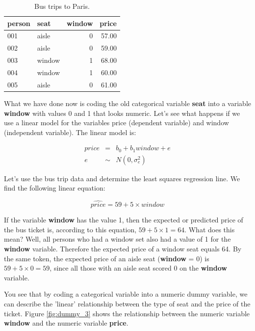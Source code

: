 \documentclass[]{book}\usepackage[]{graphicx}\usepackage[]{color}
\begin{document}
\begin{table}[ht]
\centering
\caption{Bus trips to Paris.} 
\label{tab:dummy_2}
\begin{tabular}{llrr}
  \hline
person & seat & window & price \\ 
  \hline
001 & aisle & 0 & 57.00 \\ 
  002 & aisle & 0 & 59.00 \\ 
  003 & window & 1 & 68.00 \\ 
  004 & window & 1 & 60.00 \\ 
  005 & aisle & 0 & 61.00 \\ 
   \hline
\end{tabular}
\end{table}


What we have done now is coding the old categorical variable \textbf{seat} into a variable \textbf{window} with values 0 and 1 that looks numeric. Let's see what happens if we use a linear model for the variables price (dependent variable) and window (independent variable). The linear model is:

\begin{eqnarray}
price &=& b_0 + b_1 window + e \\
e &\sim& N(0,\sigma^2_e)
\end{eqnarray}

Let's use the bus trip data and determine the least squares regression line. We find the following linear equation:


\begin{equation}
\widehat{price} = 59 + 5 \times window
\end{equation}

If the variable \textbf{window} has the value 1, then the expected or predicted price of the bus ticket is, according to this equation, $59 + 5\times  1= 64$. What does this mean? Well, all persons who had a window set also had a value of 1 for the \textbf{window} variable. Therefore the expected price of a window seat equals 64. By the same token, the expected price of an aisle seat (\textbf{window} = 0) is $59 + 5\times 0= 59$, since all those with an aisle seat scored 0 on the \textbf{window} variable.

You see that by coding a categorical variable into a numeric dummy variable, we can describe the 'linear' relationship between the type of seat and the price of the ticket. Figure \ref{fig:dummy_3} shows the relationship between the numeric variable \textbf{window} and the numeric variable \textbf{price}. 
\end{document}
